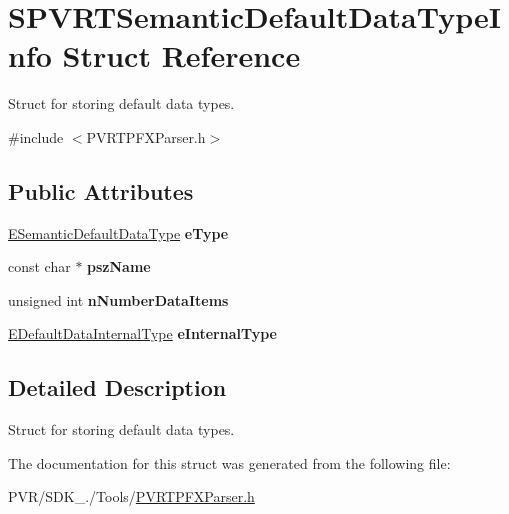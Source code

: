 \hypertarget{struct_s_p_v_r_t_semantic_default_data_type_info}{\section{S\+P\+V\+R\+T\+Semantic\+Default\+Data\+Type\+Info Struct Reference}
\label{struct_s_p_v_r_t_semantic_default_data_type_info}
}


Struct for storing default data types.  




{\ttfamily \#include $<$P\+V\+R\+T\+P\+F\+X\+Parser.\+h$>$}

\subsection*{Public Attributes}
\begin{DoxyCompactItemize}
\item 
\hypertarget{struct_s_p_v_r_t_semantic_default_data_type_info_a83739bda45c18f474768fd9189190da2}{\hyperlink{_p_v_r_t_p_f_x_parser_8h_a8027993149213b0ea29b036f584e213f}{E\+Semantic\+Default\+Data\+Type} {\bfseries e\+Type}}\label{struct_s_p_v_r_t_semantic_default_data_type_info_a83739bda45c18f474768fd9189190da2}

\item 
\hypertarget{struct_s_p_v_r_t_semantic_default_data_type_info_a61b116084112c983953c3b119e40f27f}{const char $\ast$ {\bfseries psz\+Name}}\label{struct_s_p_v_r_t_semantic_default_data_type_info_a61b116084112c983953c3b119e40f27f}

\item 
\hypertarget{struct_s_p_v_r_t_semantic_default_data_type_info_afc59db720172bde754e4335d419f3b2d}{unsigned int {\bfseries n\+Number\+Data\+Items}}\label{struct_s_p_v_r_t_semantic_default_data_type_info_afc59db720172bde754e4335d419f3b2d}

\item 
\hypertarget{struct_s_p_v_r_t_semantic_default_data_type_info_ac150dc8a677514a4f16224ba929156d4}{\hyperlink{_p_v_r_t_p_f_x_parser_8h_ab59eaf08ff4ba043995e3a53fdec5271}{E\+Default\+Data\+Internal\+Type} {\bfseries e\+Internal\+Type}}\label{struct_s_p_v_r_t_semantic_default_data_type_info_ac150dc8a677514a4f16224ba929156d4}

\end{DoxyCompactItemize}


\subsection{Detailed Description}
Struct for storing default data types. 



 

The documentation for this struct was generated from the following file\+:\begin{DoxyCompactItemize}
\item 
P\+V\+R/\+S\+D\+K\+\_./\+Tools/\hyperlink{_p_v_r_t_p_f_x_parser_8h}{P\+V\+R\+T\+P\+F\+X\+Parser.\+h}\end{DoxyCompactItemize}

